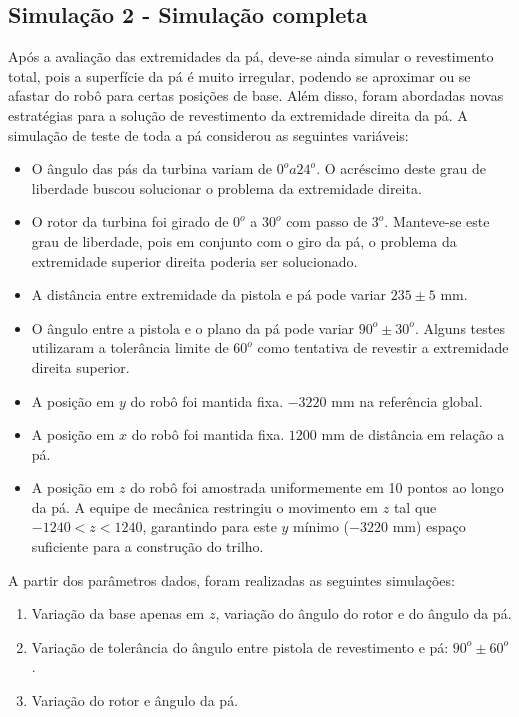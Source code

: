 \subsection{Simulação 2 - Simulação completa}

Após a avaliação das extremidades da pá, deve-se ainda simular o revestimento
total, pois a superfície da pá é muito irregular, podendo se aproximar ou se
afastar do robô para certas posições de base. Além disso, foram abordadas novas
estratégias para a solução de revestimento da extremidade direita da pá. A
simulação de teste de toda a pá considerou as seguintes variáveis:

\begin{itemize}
  \item O ângulo das pás da turbina variam de $0^o a 24^o$. O acréscimo deste
  grau de liberdade buscou solucionar o problema da extremidade direita.
  \item O rotor da turbina foi girado de $0^o$ a $30^o$ com passo de $3^o$.
  Manteve-se este grau de liberdade, pois em conjunto com o giro da pá, o
  problema da extremidade superior direita poderia ser solucionado.
  \item A distância entre extremidade da pistola e pá pode variar $235
  \pm 5$ mm.
  \item O ângulo entre a pistola e o plano da pá pode variar $90^o \pm
  30^o$. Alguns testes utilizaram a tolerância limite de $60^o$ como tentativa
  de revestir a extremidade direita superior.
  \item A posição em $y$ do robô foi mantida fixa. $-3220$ mm na referência
  global.
  \item A posição em $x$ do robô foi mantida fixa. $1200$ mm de
  distância em relação a pá.
  \item A posição em $z$ do robô foi amostrada uniformemente em 10 pontos ao
  longo da pá. A equipe de mecânica restringiu o movimento em $z$ tal que
  $-1240 < z < 1240$, garantindo para este $y$ mínimo ($-3220$ mm) espaço
  suficiente para a construção do trilho.
\end{itemize}

A partir dos parâmetros dados, foram realizadas as seguintes simulações:
\begin{enumerate}
  \item Variação da base apenas em $z$, variação do ângulo do rotor e do ângulo
  da pá.
  \item Variação de tolerância do ângulo entre pistola de revestimento e pá: $90^o \pm
  60^o$.
  \item Variação do rotor e ângulo da pá.
\end{enumerate}

